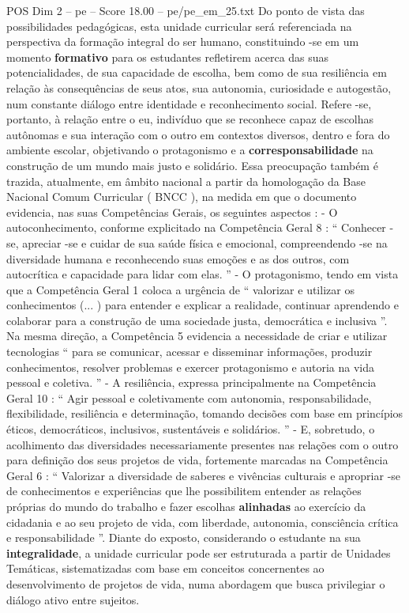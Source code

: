 \begin{textsample}{POS Dim 2 – pe – Score 18.00 – pe/pe\_em\_25.txt}
Do ponto de vista das possibilidades pedagógicas, esta unidade curricular será referenciada na perspectiva da formação integral do ser humano, constituindo -se em um momento \textbf{formativo} para os estudantes refletirem acerca das suas potencialidades, de sua capacidade de escolha, bem como de sua resiliência em relação às consequências de seus atos, sua autonomia, curiosidade e autogestão, num constante diálogo entre identidade e reconhecimento social.
Refere -se, portanto, à relação entre o eu, indivíduo que se reconhece capaz de escolhas autônomas e sua interação com o outro em contextos diversos, dentro e fora do ambiente escolar, objetivando o protagonismo e a \textbf{corresponsabilidade} na construção de um mundo mais justo e solidário.
Essa preocupação também é trazida, atualmente, em âmbito nacional a partir da homologação da Base Nacional Comum Curricular ( BNCC ), na medida em que o documento evidencia, nas suas Competências Gerais, os seguintes aspectos : - O autoconhecimento, conforme explicitado na Competência Geral 8 : “ Conhecer -se, apreciar -se e cuidar de sua saúde física e emocional, compreendendo -se na diversidade humana e reconhecendo suas emoções e as dos outros, com autocrítica e capacidade para lidar com elas. ” - O protagonismo, tendo em vista que a Competência Geral 1 coloca a urgência de “ valorizar e utilizar os conhecimentos (... ) para entender e explicar a realidade, continuar aprendendo e colaborar para a construção de uma sociedade justa, democrática e inclusiva ”.
Na mesma direção, a Competência 5 evidencia a necessidade de criar e utilizar tecnologias “ para se comunicar, acessar e disseminar informações, produzir conhecimentos, resolver problemas e exercer protagonismo e autoria na vida pessoal e coletiva. ” - A resiliência, expressa principalmente na Competência Geral 10 : “ Agir pessoal e coletivamente com autonomia, responsabilidade, flexibilidade, resiliência e determinação, tomando decisões com base em princípios éticos, democráticos, inclusivos, sustentáveis e solidários. ” - E, sobretudo, o acolhimento das diversidades necessariamente presentes nas relações com o outro para definição dos seus projetos de vida, fortemente marcadas na Competência Geral 6 : “ Valorizar a diversidade de saberes e vivências culturais e apropriar -se de conhecimentos e experiências que lhe possibilitem entender as relações próprias do mundo do trabalho e fazer escolhas \textbf{alinhadas} ao exercício da cidadania e ao seu projeto de vida, com liberdade, autonomia, consciência crítica e responsabilidade ”.
Diante do exposto, considerando o estudante na sua \textbf{integralidade}, a unidade curricular pode ser estruturada a partir de Unidades Temáticas, sistematizadas com base em conceitos concernentes ao desenvolvimento de projetos de vida, numa abordagem que busca privilegiar o diálogo ativo entre sujeitos.

\end{textsample}
